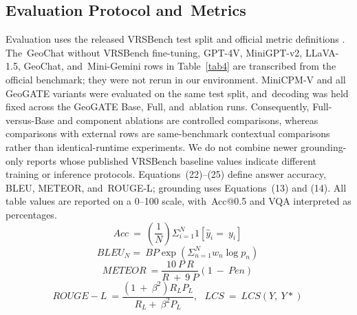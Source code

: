\documentclass[applsci,article,accept,moreauthors]{Definitions/mdpi}
\begin{document}
\subsection{Evaluation Protocol and~Metrics}

Evaluation uses the released VRSBench test split and official metric definitions \citep{ref11}. The~GeoChat without VRSBench fine-tuning, GPT-4V, MiniGPT-v2, LLaVA-1.5, GeoChat, and~Mini-Gemini rows in Table~\ref{tab4} are transcribed from the official benchmark; they were not rerun in our environment. MiniCPM-V and all GeoGATE variants were evaluated on the same test split, and~decoding was held fixed across the GeoGATE Base, Full, and~ablation runs. Consequently, Full-versus-Base and component ablations are controlled comparisons, whereas comparisons with external rows are same-benchmark contextual comparisons rather than identical-runtime experiments. We do not combine newer grounding-only reports whose published VRSBench baseline values indicate different training or inference protocols. Equations~(22)--(25) define answer accuracy, BLEU, METEOR, and~ROUGE-L; grounding uses Equations~(13) and (14). All table values are reported on a 0--100 scale, with~Acc@0.5 and VQA interpreted as percentages.
\begin{equation}
Acc\  = \ \left( \frac{1}{N} \right)\Sigma_{i = 1}^{N}1\left[ \hat{y}_{i} = \ y_{i} \right]\
\label{eq22}
\end{equation}
\begin{equation}
BLEU_{N} = \ BP\exp\left( \Sigma_{n = 1}^{N}w_{n}\log p_{n} \right)\
\label{eq23}
\end{equation}
\begin{equation}
METEOR\  = \frac{10\ P\ R}{R\  + \ 9\ P}(1\  - \ Pen)\
\label{eq24}
\end{equation}
\begin{equation}
ROUGE - L\  = \frac{\left( 1\  + \ \beta^{2} \right)R_{L}P_{L}}{R_{L} + \ \beta^{2}P_{L}},\ \ \ LCS\  = \ LCS(Y,\ Y*)\
\label{eq25}
\end{equation}
\end{document}
